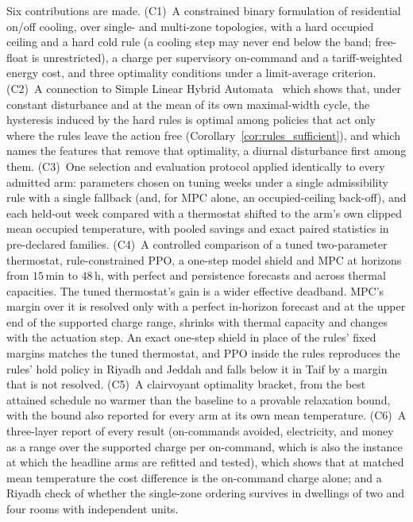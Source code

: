 \documentclass[3p,twocolumn,number]{elsarticle}
\begin{document}
Six contributions are made. (C1)~A constrained binary formulation of residential on/off cooling, over single- and multi-zone topologies, with a hard occupied ceiling and a hard cold rule (a cooling step may never end below the band; free-float is unrestricted), a charge per supervisory on-command and a tariff-weighted energy cost, and three optimality conditions under a limit-average criterion. (C2)~A connection to Simple Linear Hybrid Automata~\cite{Mousa2016} which shows that, under constant disturbance and at the mean of its own maximal-width cycle, the hysteresis induced by the hard rules is optimal among policies that act only where the rules leave the action free (Corollary~\ref{cor:rules_sufficient}), and which names the features that remove that optimality, a diurnal disturbance first among them. (C3)~One selection and evaluation protocol applied identically to every admitted arm: parameters chosen on tuning weeks under a single admissibility rule with a single fallback (and, for MPC alone, an occupied-ceiling back-off), and each held-out week compared with a thermostat shifted to the arm's own clipped mean occupied temperature, with pooled savings and exact paired statistics in pre-declared families. (C4)~A controlled comparison of a tuned two-parameter thermostat, rule-constrained PPO, a one-step model shield and MPC at horizons from $15\,$min to $48\,$h, with perfect and persistence forecasts and across thermal capacities. The tuned thermostat's gain is a wider effective deadband. MPC's margin over it is resolved only with a perfect in-horizon forecast and at the upper end of the supported charge range, shrinks with thermal capacity and changes with the actuation step. An exact one-step shield in place of the rules' fixed margins matches the tuned thermostat, and PPO inside the rules reproduces the rules' hold policy in Riyadh and Jeddah and falls below it in Taif by a margin that is not resolved. (C5)~A clairvoyant optimality bracket, from the best attained schedule no warmer than the baseline to a provable relaxation bound, with the bound also reported for every arm at its own mean temperature. (C6)~A three-layer report of every result (on-commands avoided, electricity, and money as a range over the supported charge per on-command, which is also the instance at which the headline arms are refitted and tested), which shows that at matched mean temperature the cost difference is the on-command charge alone; and a Riyadh check of whether the single-zone ordering survives in dwellings of two and four rooms with independent units.
\end{document}
